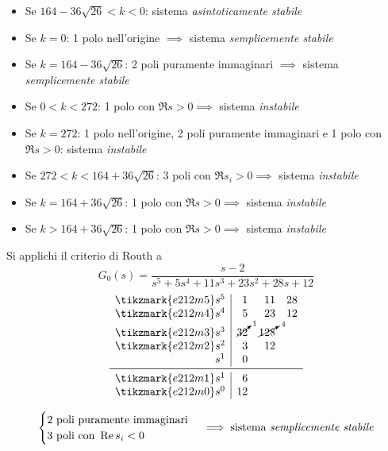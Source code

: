 \begin{itemize}
	\item Se \(164-36\sqrt{26} < k < 0\): sistema \emph{asintoticamente stabile}
	\item Se \(k = 0\): 1 polo nell'origine \(\implies\) sistema \emph{semplicemente stabile}
	\item Se \(k = 164-36\sqrt{26}\): 2 poli puramente immaginari \(\implies\) sistema \emph{semplicemente stabile}
	\item Se \(0 < k < 272\): 1 polo con \(\Re s > 0 \implies\) sistema \emph{instabile}
	\item Se \(k = 272\): 1 polo nell'origine, 2 poli puramente immaginari e 1 polo con \(\Re s > 0\): sistema \emph{instabile}
	\item Se \(272 < k < 164+36\sqrt{26}\): 3 poli con \(\Re s_i > 0 \implies\) sistema \emph{instabile}
	\item Se \(k = 164+36\sqrt{26}\): 1 polo con \(\Re s > 0 \implies\) sistema \emph{instabile}
	\item Se \(k > 164+36\sqrt{26}\): 1 polo con \(\Re s > 0 \implies\) sistema \emph{instabile}
\end{itemize}


\exercise{} Si applichi il criterio di Routh a
\[
	G_0(s) = \frac{s-2}{s^5 +5s^4 +11s^3 +23s^2 +28s +12}
\]
\[\begin{array}{r|rrr}
	\tikzmark{e212m5} s^5 & 1 & 11 & 28 \\
	\tikzmark{e212m4} s^4 & 5 & 23 & 12 \\
	\tikzmark{e212m3} s^3 & \cancelto{1}{32} & \cancelto{4}{128} \\
	\tikzmark{e212m2} s^2 & 3 & 12	   \\
			 s^1 & 0	   \\
	\midrule
	\tikzmark{e212m1} s^1 & 6	   \\
	\tikzmark{e212m0} s^0 & 12
\end{array}\]
\[\begin{cases}
	2 \text{ poli puramente immaginari} \\
	3 \text{ poli con } \Re s_i < 0
\end{cases} \implies \text{sistema \emph{semplicemente stabile}}\]

